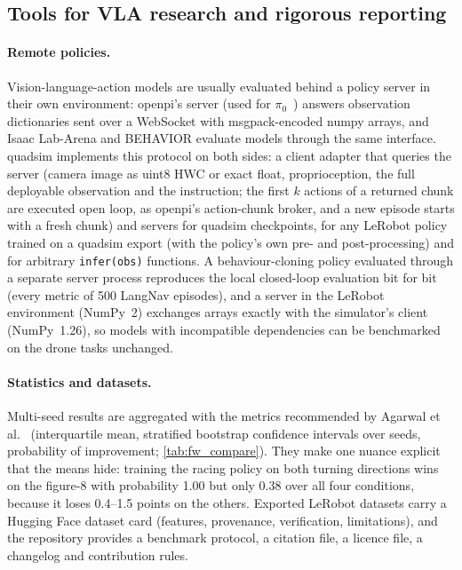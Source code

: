 \subsection{Tools for VLA research and rigorous reporting}\label{sec:tools}
\paragraph{Remote policies.} Vision-language-action models are usually evaluated behind a policy server in their own
environment: openpi's server (used for $\pi_0$~\cite{black2024pi0}) answers observation dictionaries sent over a
WebSocket with msgpack-encoded numpy arrays, and Isaac Lab-Arena and BEHAVIOR evaluate models through the same
interface. quadsim implements this protocol on both sides: a client adapter that queries the server (camera image as
uint8 HWC or exact float, proprioception, the full deployable observation and the instruction; the first $k$ actions
of a returned chunk are executed open loop, as openpi's action-chunk broker, and a new episode starts with a fresh
chunk) and servers for quadsim checkpoints, for any LeRobot policy trained on a quadsim export (with the policy's own
pre- and post-processing) and for arbitrary \texttt{infer(obs)} functions. A behaviour-cloning policy evaluated through a separate server process reproduces the
local closed-loop evaluation bit for bit (every metric of 500 LangNav episodes), and a server in the LeRobot
environment (NumPy~2) exchanges arrays exactly with the simulator's client (NumPy~1.26), so models with incompatible
dependencies can be benchmarked on the drone tasks unchanged.

\paragraph{Statistics and datasets.} Multi-seed results are aggregated with the metrics recommended by Agarwal et
al.~\cite{agarwal2021precipice} (interquartile mean, stratified bootstrap confidence intervals over seeds, probability of
improvement; \cref{tab:fw_compare}). They make one nuance explicit that the means hide: training the racing policy on
both turning directions wins on the figure-8 with probability 1.00 but only 0.38 over all four conditions, because
it loses 0.4--1.5 points on the others. Exported LeRobot datasets carry a Hugging Face dataset card (features,
provenance, verification, limitations), and the repository provides a benchmark protocol, a citation file, a licence
file, a changelog and contribution rules.

